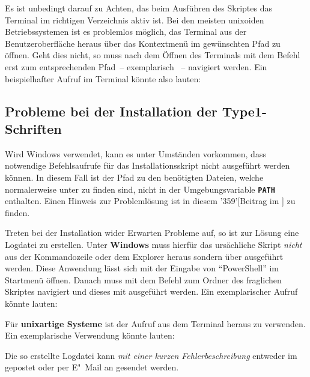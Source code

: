 Es ist unbedingt darauf zu Achten, das beim Ausführen des Skriptes das Terminal 
im richtigen Verzeichnis aktiv ist. Bei den meisten unixoiden Betriebssystemen 
ist es problemlos möglich, das Terminal aus der Benutzeroberfläche heraus über 
das Kontextmenü im gewünschten Pfad zu öffnen. Geht dies nicht, so muss nach 
dem Öffnen des Terminals mit dem Befehl  erst zum entsprechenden 
Pfad~-- exemplarisch ~-- 
navigiert werden. Ein beispielhafter Aufruf im Terminal könnte also lauten:
%
\begin{quoting}
\RET*%
\RET%
\end{quoting}



\subsection{Probleme bei der Installation der Type1-Schriften}

Wird Windows verwendet, kann es unter Umständen vorkommen, dass notwendige 
Befehlsaufrufe für das Installationsskript nicht ausgeführt werden können. In 
diesem Fall ist der Pfad zu den benötigten Dateien, welche normalerweise unter 
 zu finden sind, nicht in der 
Umgebungsvariable \textbf{\texttt{PATH}} enthalten. Einen Hinweis zur 
Problemlösung ist in diesem \Forum'359'[Beitrag im \TUDForum] zu finden.

Treten bei der Installation wider Erwarten Probleme auf, so ist zur Lösung eine 
Logdatei zu erstellen. Unter \textbf{Windows} muss hierfür das ursächliche 
Skript \emph{nicht} aus der Kommandozeile oder dem Explorer heraus sondern über 
 ausgeführt werden. Diese Anwendung lässt sich 
mit der Eingabe von \enquote{PowerShell} im Startmenü öffnen. Danach muss mit 
dem Befehl  zum Ordner des fraglichen Skriptes navigiert und dieses 
mit  
ausgeführt werden. Ein exemplarischer Aufruf könnte lauten:
%
\begin{quoting}
\RET*%
\RET%
\end{quoting}
%
Für \textbf{unixartige Systeme} ist der Aufruf 
 aus dem Terminal heraus zu 
verwenden. Ein exemplarische Verwendung könnte lauten:
%
\begin{quoting}
\RET*%
\RET%
\end{quoting}
%
Die so erstellte Logdatei kann \emph{mit einer kurzen Fehlerbeschreibung} 
entweder im \Forum gepostet oder per E"~Mail an \mailto{\TUDScriptContact}
gesendet werden.



